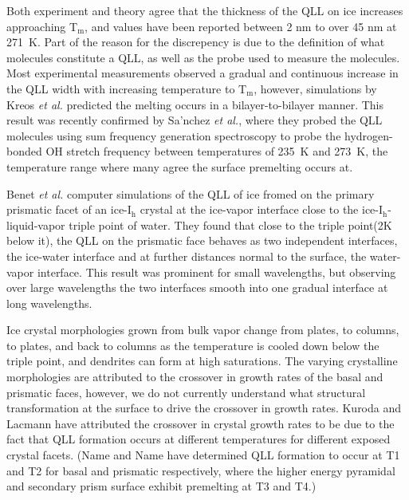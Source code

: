 Both experiment and theory agree that the thickness of the QLL on ice
increases approaching T$_\mathrm{m}$, and values have been reported
between 2 nm to over 45 nm at 271~K. Part of the reason for the
discrepency is due to the definition of what molecules constitute a
QLL, as well as the probe used to measure the molecules. Most
experimental measurements observed a gradual and continuous increase
in the QLL width with increasing temperature to T$_\mathrm{m}$,
however, simulations by Kreos \textit{et al.} predicted the melting
occurs in a bilayer-to-bilayer manner. This result was recently
confirmed by Sa'nchez \textit{et al.}, where they probed the QLL
molecules using sum frequency generation spectroscopy to probe the
hydrogen-bonded OH stretch frequency between temperatures of 235~K
and 273~K, the temperature range where many agree the surface
premelting occurs at.

Benet \textit{et al.} computer simulations of the QLL of ice fromed on
the primary prismatic facet of an ice-I$_\mathrm{h}$ crystal at the
ice-vapor interface close to the ice-I$_\mathrm{h}$-liquid-vapor
triple point of water.\cite{Benet2016} They found that close to the
triple point(2K below it), the QLL on the prismatic face behaves as
two independent interfaces, the ice-water interface and at further
distances normal to the surface, the water-vapor interface. This
result was prominent for small wavelengths, but observing over large
wavelengths the two interfaces smooth into one gradual interface at
long wavelengths.

Ice crystal morphologies grown from bulk vapor change from plates, to
columns, to plates, and back to columns as the temperature is cooled
down below the triple point, and dendrites can form at high
saturations.\cite{K. G. Libbrecht, Rep. Prog. Phys. 68, 855 (2005).}
The varying crystalline morphologies are attributed to the crossover
in growth rates of the basal and prismatic faces, however, we do not
currently understand what structural transformation at the surface to
drive the crossover in growth rates.\cite{1,2,4,5} Kuroda and Lacmann
have attributed the crossover in crystal growth rates to be due to the
fact that QLL formation occurs at different temperatures for different
exposed crystal facets.\cite{6} (Name and Name have determined QLL
formation to occur at T1 and T2 for basal and prismatic respectively,
where the higher energy pyramidal and secondary prism surface exhibit
premelting at T3 and T4.)

